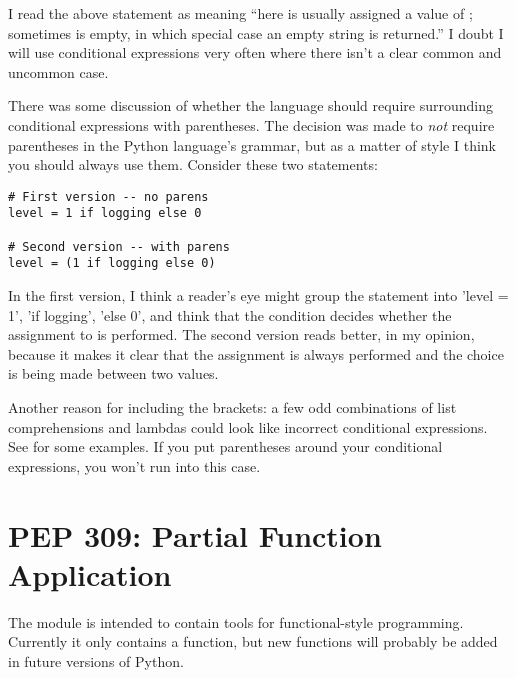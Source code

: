 \documentclass{howto}
\begin{document}
I read the above statement as meaning ``here  is 
usually assigned a value of ; sometimes 
 is empty, in which special case an empty string is returned.''  
I doubt I will use conditional expressions very often where there 
isn't a clear common and uncommon case.

There was some discussion of whether the language should require
surrounding conditional expressions with parentheses.  The decision
was made to \emph{not} require parentheses in the Python language's
grammar, but as a matter of style I think you should always use them.
Consider these two statements:

\begin{verbatim}
# First version -- no parens
level = 1 if logging else 0

# Second version -- with parens
level = (1 if logging else 0)
\end{verbatim}

In the first version, I think a reader's eye might group the statement
into 'level = 1', 'if logging', 'else 0', and think that the condition
decides whether the assignment to  is performed.  The
second version reads better, in my opinion, because it makes it clear
that the assignment is always performed and the choice is being made
between two values.

Another reason for including the brackets: a few odd combinations of
list comprehensions and lambdas could look like incorrect conditional
expressions. See  for some examples.  If you put parentheses
around your conditional expressions, you won't run into this case.


\begin{seealso}


\end{seealso}


\section{PEP 309: Partial Function Application\label{pep-309}}

The  module is intended to contain tools for
functional-style programming.  Currently it only contains a
 function, but new functions will probably be added
in future versions of Python.
\end{document}
